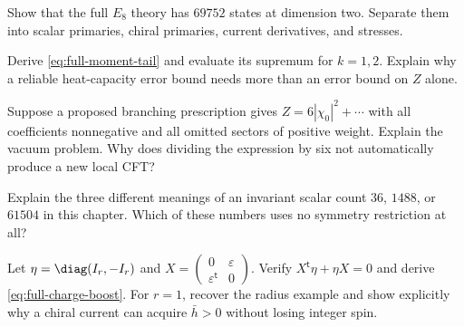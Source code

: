 \begin{exercise}\label{ex:full-E8states}
Show that the full $E_8$ theory has $69752$ states at dimension
two. Separate them into scalar primaries, chiral primaries,
current derivatives, and stresses.

\par\smallskip{}\par
\end{exercise}

\begin{exercise}\label{ex:full-tail}
Derive \eqref{eq:full-moment-tail} and evaluate its supremum for
$k=1,2$. Explain why a reliable heat-capacity error bound needs
more than an error bound on $Z$ alone.

\par\smallskip{}\par
\end{exercise}

\begin{exercise}\label{ex:full-onevac}
Suppose a proposed branching prescription gives
$Z=6|\chi_0|^2+\cdots$ with all coefficients nonnegative and
all omitted sectors of positive weight. Explain the vacuum
problem. Why does dividing the expression by six not automatically
produce a new local CFT?

\par\smallskip{}\par
\end{exercise}

\begin{exercise}\label{ex:full-symmetry}
Explain the three different meanings of an invariant scalar count
$36$, $1488$, or $61504$ in this chapter. Which of these numbers
uses no symmetry restriction at all?

\par\smallskip{}\par
\end{exercise}

\begin{exercise}\label{ex:full-boost}
Let $\eta=\diag(I_r,-I_r)$ and
$X=\left(\begin{smallmatrix}0&\varepsilon\\
\varepsilon^{\mathsf t}&0\end{smallmatrix}\right)$.
Verify $X^{\mathsf t}\eta+\eta X=0$ and derive
\eqref{eq:full-charge-boost}. For $r=1$, recover the radius
example and show explicitly why a chiral current can acquire
$\bar h>0$ without losing integer spin.

\par\smallskip{}\par
\end{exercise}
